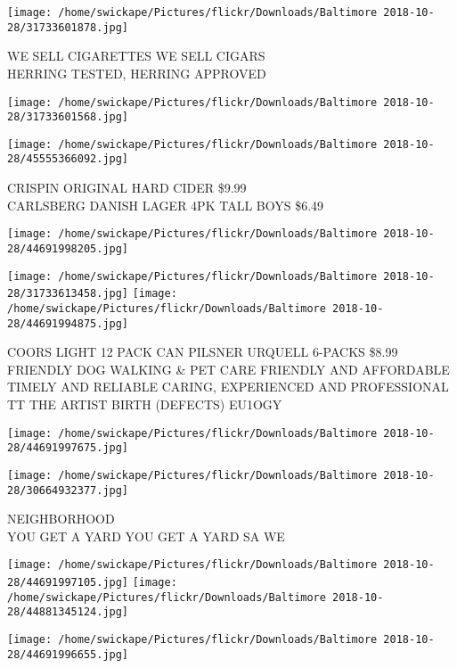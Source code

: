 \documentclass[10pt,letterpaper]{article}
\begin{document}
\vspace{0.25in}
\texttt{[image: /home/swickape/Pictures/flickr/Downloads/Baltimore 2018-10-28/31733601878.jpg]}

WE SELL CIGARETTES WE SELL CIGARS\\
HERRING TESTED, HERRING APPROVED
\pagebreak

\texttt{[image: /home/swickape/Pictures/flickr/Downloads/Baltimore 2018-10-28/31733601568.jpg]}

\vspace{0.25in}
\texttt{[image: /home/swickape/Pictures/flickr/Downloads/Baltimore 2018-10-28/45555366092.jpg]}

CRISPIN ORIGINAL HARD CIDER \$9.99\\
CARLSBERG DANISH LAGER 4PK TALL BOYS \$6.49
\pagebreak

\texttt{[image: /home/swickape/Pictures/flickr/Downloads/Baltimore 2018-10-28/44691998205.jpg]}

\vspace{0.25in}
\texttt{[image: /home/swickape/Pictures/flickr/Downloads/Baltimore 2018-10-28/31733613458.jpg]}
\texttt{[image: /home/swickape/Pictures/flickr/Downloads/Baltimore 2018-10-28/44691994875.jpg]}

COORS LIGHT 12 PACK CAN PILSNER URQUELL 6{-}PACKS \$8.99\\
FRIENDLY DOG WALKING \& PET CARE FRIENDLY AND AFFORDABLE TIMELY AND RELIABLE CARING, EXPERIENCED AND PROFESSIONAL\\
TT THE ARTIST BIRTH (DEFECTS) EU1OGY
\pagebreak

\texttt{[image: /home/swickape/Pictures/flickr/Downloads/Baltimore 2018-10-28/44691997675.jpg]}

\vspace{0.25in}
\texttt{[image: /home/swickape/Pictures/flickr/Downloads/Baltimore 2018-10-28/30664932377.jpg]}

NEIGHBORHOOD\\
YOU GET A YARD YOU GET A YARD SA WE
\pagebreak

\texttt{[image: /home/swickape/Pictures/flickr/Downloads/Baltimore 2018-10-28/44691997105.jpg]}
\texttt{[image: /home/swickape/Pictures/flickr/Downloads/Baltimore 2018-10-28/44881345124.jpg]}

\texttt{[image: /home/swickape/Pictures/flickr/Downloads/Baltimore 2018-10-28/44691996655.jpg]}
\end{document}
